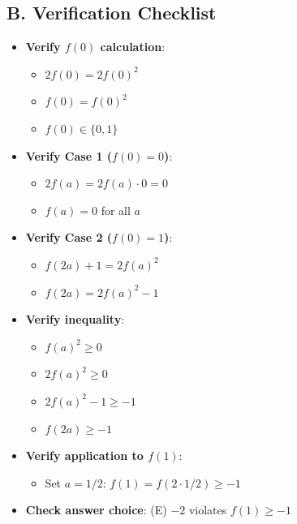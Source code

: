 \documentclass[12pt]{article}
\begin{document}
\begin{verificationbox}
\subsection*{B. Verification Checklist}
\begin{itemize}[leftmargin=*]
    \item \textbf{Verify $f(0)$ calculation}:
    \begin{itemize}
        \item $2f(0) = 2f(0)^2$ \checkmark
        \item $f(0) = f(0)^2$ \checkmark
        \item $f(0) \in \{0, 1\}$ \checkmark
    \end{itemize}
    \item \textbf{Verify Case 1 ($f(0) = 0$)}:
    \begin{itemize}
        \item $2f(a) = 2f(a) \cdot 0 = 0$ \checkmark
        \item $f(a) = 0$ for all $a$ \checkmark
    \end{itemize}
    \item \textbf{Verify Case 2 ($f(0) = 1$)}:
    \begin{itemize}
        \item $f(2a) + 1 = 2f(a)^2$ \checkmark
        \item $f(2a) = 2f(a)^2 - 1$ \checkmark
    \end{itemize}
    \item \textbf{Verify inequality}:
    \begin{itemize}
        \item $f(a)^2 \geq 0$ \checkmark
        \item $2f(a)^2 \geq 0$ \checkmark
        \item $2f(a)^2 - 1 \geq -1$ \checkmark
        \item $f(2a) \geq -1$ \checkmark
    \end{itemize}
    \item \textbf{Verify application to $f(1)$}:
    \begin{itemize}
        \item Set $a = 1/2$: $f(1) = f(2 \cdot 1/2) \geq -1$ \checkmark
    \end{itemize}
    \item \textbf{Check answer choice}: (E) $-2$ violates $f(1) \geq -1$ \checkmark
\end{itemize}


\end{verificationbox}
\end{document}
